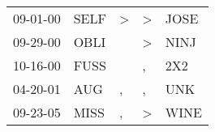 \begin{supertabular}{p{0.07\textwidth}p{0.06\textwidth}p{0.02\textwidth}p{0.02\textwidth}p{0.06\textwidth}}
 09-01-00\textsuperscript{} &  SELF\textsuperscript{} &  \textgreater &  \textgreater &  JOSE\textsuperscript{} \\
 09-29-00\textsuperscript{} &  OBLI\textsuperscript{} &               &  \textgreater &  NINJ\textsuperscript{} \\
 10-16-00\textsuperscript{} &  FUSS\textsuperscript{} &               &             , &   2X2\textsuperscript{} \\
 04-20-01\textsuperscript{} &   AUG\textsuperscript{} &             , &             , &   UNK\textsuperscript{} \\
 09-23-05\textsuperscript{} &  MISS\textsuperscript{} &             , &  \textgreater &  WINE\textsuperscript{} \\
\end{supertabular}
